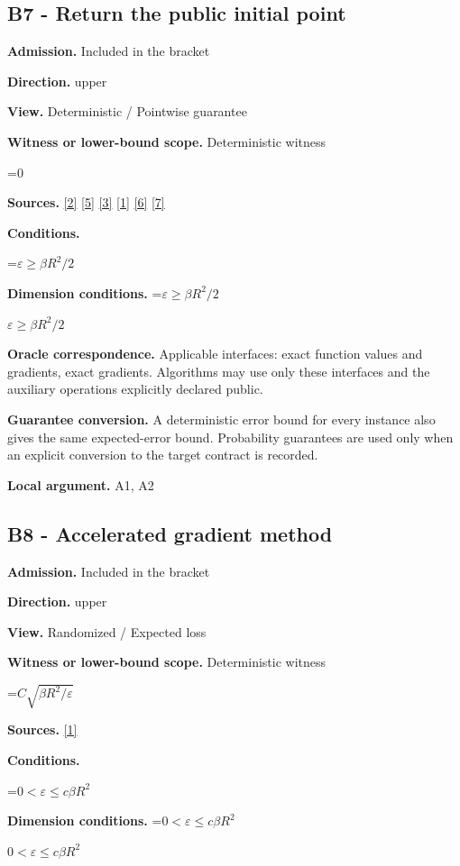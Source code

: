 \documentclass[10pt,a4paper]{article}
\newcommand{\AtlasMath}[1]{\par\begingroup\centering\setbox0=\hbox{$\displaystyle #1$}\ifdim\wd0>1.4\linewidth\typeout{ATLAS WIDE FORMULA: \the\wd0}\fi\ifdim\wd0>\linewidth\resizebox{\linewidth}{!}{\box0}\else\box0\fi\par\endgroup}
\newcommand{\AtlasInlineMath}[1]{\begingroup\setbox0=\hbox{$#1$}\ifdim\wd0>.4\linewidth\endgroup\AtlasMath{#1}\else\endgroup$#1$\fi}
\begin{document}
\subsection{B7 - Return the public initial point}
\textbf{Admission.} Included in the bracket

\textbf{Direction.} upper

\textbf{View.} Deterministic / Pointwise guarantee

\textbf{Witness or lower-bound scope.} Deterministic witness

\AtlasMath{0}
\textbf{Sources.} \href{https://arxiv.org/pdf/2101.09740v2}{[2]} \href{https://arxiv.org/pdf/2609.33360v2}{[5]} \href{https://arxiv.org/pdf/2609.10874}{[3]} \href{https://arxiv.org/pdf/1405.4980}{[1]} \href{https://www2.isye.gatech.edu/~nemirovs/MOR_AccuracyCertificates.pdf}{[6]} \href{https://arxiv.org/pdf/2609.20701}{[7]}

\textbf{Conditions.} 
\AtlasMath{\varepsilon\ge\beta R^2/2}


\textbf{Dimension conditions.} \AtlasInlineMath{\varepsilon\ge\beta R^2/2}

\textbf{Oracle correspondence.} Applicable interfaces: exact function values and gradients, exact gradients. Algorithms may use only these interfaces and the auxiliary operations explicitly declared public.

\textbf{Guarantee conversion.} A deterministic error bound for every instance also gives the same expected-error bound. Probability guarantees are used only when an explicit conversion to the target contract is recorded.

\textbf{Local argument.} A1, A2

\subsection{B8 - Accelerated gradient method}
\textbf{Admission.} Included in the bracket

\textbf{Direction.} upper

\textbf{View.} Randomized / Expected loss

\textbf{Witness or lower-bound scope.} Deterministic witness

\AtlasMath{C\sqrt{\beta R^2/\varepsilon}}
\textbf{Sources.} \href{https://arxiv.org/pdf/1405.4980}{[1]}

\textbf{Conditions.} 
\AtlasMath{0<\varepsilon\le c\beta R^2}


\textbf{Dimension conditions.} \AtlasInlineMath{0<\varepsilon\le c\beta R^2}
\end{document}

